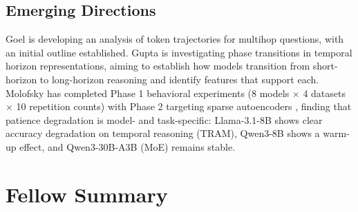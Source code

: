 \documentclass[midterm]{sparreport}
\begin{document}
\subsection{Emerging Directions}

Goel is developing an analysis of token trajectories for multihop questions, with an initial outline established. Gupta is investigating phase transitions in temporal horizon representations, aiming to establish how models transition from short-horizon to long-horizon reasoning and identify features that support each. Molofsky has completed Phase 1 behavioral experiments (8 models $\times$ 4 datasets $\times$ 10 repetition counts) with Phase 2 targeting sparse autoencoders \cite{cunningham2023sparse}, finding that patience degradation is model- and task-specific: Llama-3.1-8B shows clear accuracy degradation on temporal reasoning (TRAM), Qwen3-8B shows a warm-up effect, and Qwen3-30B-A3B (MoE) remains stable.

\section*{Fellow Summary}
\end{document}
